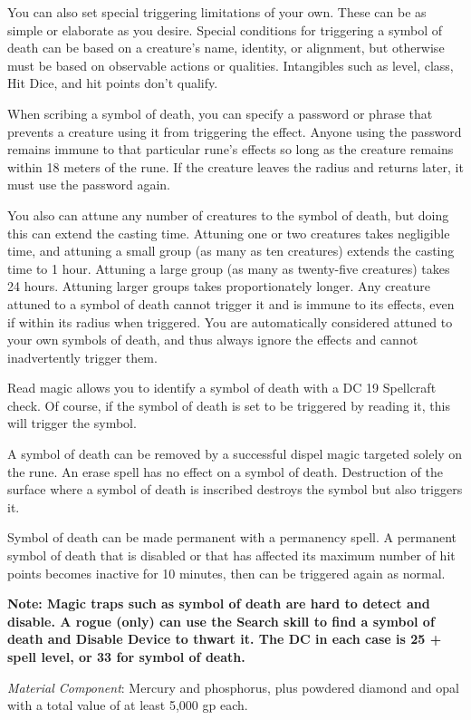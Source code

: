 {	You can also set special triggering limitations of your own. These can be as simple or elaborate as you desire. Special conditions for triggering a symbol of death can be based on a creature's name, identity, or alignment, but otherwise must be based on observable actions or qualities. Intangibles such as level, class, Hit Dice, and hit points don't qualify.

	When scribing a symbol of death, you can specify a password or phrase that prevents a creature using it from triggering the effect. Anyone using the password remains immune to that particular rune's effects so long as the creature remains within 18 meters of the rune. If the creature leaves the radius and returns later, it must use the password again.

	You also can attune any number of creatures to the symbol of death, but doing this can extend the casting time. Attuning one or two creatures takes negligible time, and attuning a small group (as many as ten creatures) extends the casting time to 1 hour. Attuning a large group (as many as twenty-five creatures) takes 24 hours. Attuning larger groups takes proportionately longer. Any creature attuned to a symbol of death cannot trigger it and is immune to its effects, even if within its radius when triggered. You are automatically considered attuned to your own symbols of death, and thus always ignore the effects and cannot inadvertently trigger them.

Read magic allows you to identify a symbol of death with a DC 19 Spellcraft check. Of course, if the symbol of death is set to be triggered by reading it, this will trigger the symbol.

	A symbol of death can be removed by a successful dispel magic targeted solely on the rune. An erase spell has no effect on a symbol of death. Destruction of the surface where a symbol of death is inscribed destroys the symbol but also triggers it.

	Symbol of death can be made permanent with a permanency spell. A permanent symbol of death that is disabled or that has affected its maximum number of hit points becomes inactive for 10 minutes, then can be triggered again as normal.

	\textbf{Note: Magic traps such as symbol of death are hard to detect and disable. A rogue (only) can use the Search skill to find a symbol of death and Disable Device to thwart it. The DC in each case is 25 + spell level, or 33 for symbol of death.}

	\textit{Material Component}:
	Mercury and phosphorus, plus powdered diamond and opal with a total value of at least 5,000 gp each.

}
